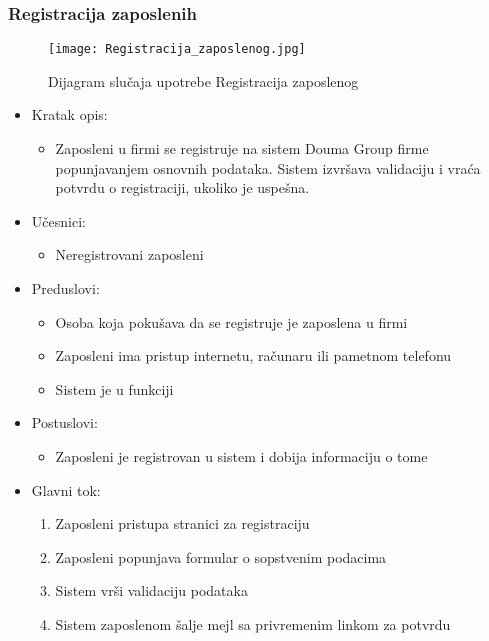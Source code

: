 \documentclass[a4paper]{article}
\begin{document}
\subsubsection{Registracija zaposlenih}

\begin{figure}[htp]
    \centering
    \texttt{[image: Registracija\_zaposlenog.jpg]}
    \caption{Dijagram slučaja upotrebe Registracija zaposlenog}
    \label{fig:RegistracijaZ}
\end{figure}

\begin{itemize}
    \item Kratak opis: 
    \begin{itemize}
        \item Zaposleni u firmi se registruje na sistem Douma Group firme popunjavanjem osnovnih podataka. Sistem izvršava validaciju i vraća potvrdu o registraciji, ukoliko je uspešna.
    \end{itemize}
    \item Učesnici:
        \begin{itemize}
        \item Neregistrovani zaposleni
    \end{itemize}
    \item Preduslovi:
        \begin{itemize}
            \item Osoba koja pokušava da se registruje je zaposlena u firmi
            \item Zaposleni ima pristup internetu, računaru ili pametnom telefonu
            \item Sistem je u funkciji
        \end{itemize}
    \item Postuslovi:
        \begin{itemize}
            \item Zaposleni je registrovan u sistem i dobija informaciju o tome
        \end{itemize}
    \item Glavni tok:
        \begin{enumerate}
            \item Zaposleni pristupa stranici za registraciju
            \item Zaposleni popunjava formular o sopstvenim podacima 
            \item Sistem vrši validaciju podataka 
            \item Sistem zaposlenom šalje mejl sa privremenim linkom za potvrdu

\end{enumerate}
\end{itemize}
\end{document}
